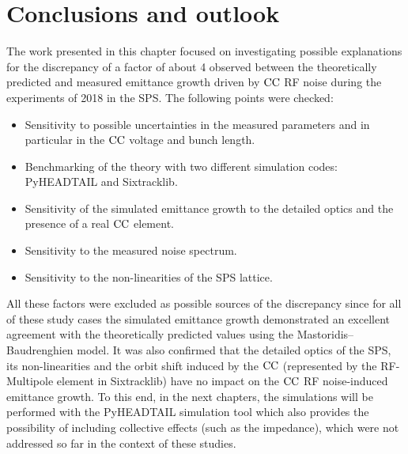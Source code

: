 \section{Conclusions and outlook}\label{sec:Ch6_conclusions}
The work presented in this chapter focused on investigating possible explanations for the discrepancy of a factor of about 4 observed between the theoretically predicted and measured emittance growth driven by ${\mathrm{CC}}$ RF noise during the experiments of 2018 in the SPS. The following points were checked:
\begin{itemize}
    \item Sensitivity to possible uncertainties in the measured parameters and in particular in the ${\mathrm{CC}}$ voltage and bunch length.
    \item Benchmarking of the theory with two different simulation codes: PyHEADTAIL and Sixtracklib.
    \item Sensitivity of the simulated emittance growth to the detailed optics and the presence of a real ${\mathrm{CC}}$ element.
    \item Sensitivity to the measured noise spectrum. 
    \item Sensitivity to the non-linearities of the SPS lattice.
\end{itemize}

All these factors were excluded as possible sources of the discrepancy since for all of these study cases the simulated emittance growth demonstrated an excellent agreement with the theoretically predicted values using the Mastoridis--Baudrenghien model. It was also confirmed that the detailed optics of the SPS, its non-linearities and the orbit shift induced by the ${\mathrm{CC}}$ (represented by the RF-Multipole element in Sixtracklib) have no impact on the ${\mathrm{CC}}$ RF noise-induced emittance growth. To this end, in the next chapters, the simulations will be performed with the PyHEADTAIL simulation tool which also provides the possibility of including collective effects (such as the impedance), which were not addressed so far in the context of these studies.